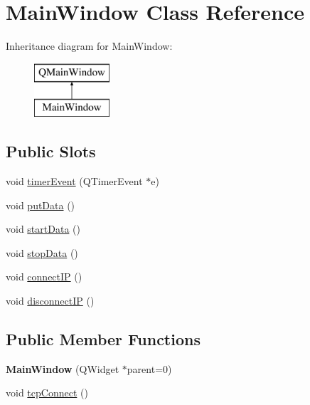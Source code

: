 \hypertarget{class_main_window}{}\section{Main\+Window Class Reference}
\label{class_main_window}
Inheritance diagram for Main\+Window\+:\begin{figure}[H]
\begin{center}
\leavevmode
\includegraphics[height=2.000000cm]{class_main_window}
\end{center}
\end{figure}
\subsection*{Public Slots}
\begin{DoxyCompactItemize}
\item 
void \hyperlink{class_main_window_a9d08a694a5f9c532225754381b8011ea}{timer\+Event} (Q\+Timer\+Event $\ast$e)
\item 
void \hyperlink{class_main_window_afdfeb13ec363b0eb8ecacaf0aa13b605}{put\+Data} ()
\item 
void \hyperlink{class_main_window_a4c2e9be0c7a1c2010da3424d48b312fa}{start\+Data} ()
\item 
void \hyperlink{class_main_window_a79fdaf1fd769f0584f50da34e415b3de}{stop\+Data} ()
\item 
void \hyperlink{class_main_window_a3dedcc90ba3cf2adc939aacc2ed6f5d5}{connect\+IP} ()
\item 
void \hyperlink{class_main_window_afb05203d61eba043eebcf3d85dd880cf}{disconnect\+IP} ()
\end{DoxyCompactItemize}
\subsection*{Public Member Functions}
\begin{DoxyCompactItemize}
\item 
\mbox{\label{class_main_window_a8b244be8b7b7db1b08de2a2acb9409db}} 
{\bfseries Main\+Window} (Q\+Widget $\ast$parent=0)
\item 
void \hyperlink{class_main_window_ac5b669957c442b6eb68573dacfce33e1}{tcp\+Connect} ()
\end{DoxyCompactItemize}
